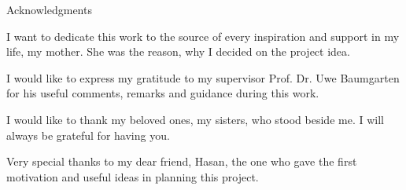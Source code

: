 \thispagestyle{empty}

\vspace*{20mm}

\begin{center}
{ Acknowledgments}
\end{center}

\vspace{10mm}

I want to dedicate this work to the source of every inspiration and support in my life, my mother. She was the reason, why I decided on the project idea.

I would like to express my gratitude to my supervisor Prof. Dr. Uwe Baumgarten for his useful comments, remarks and guidance during this work. 

I would like to thank my beloved ones, my sisters, who stood beside me. I will always be grateful for having you.

Very special thanks to my dear friend, Hasan, the one who gave the first motivation and useful ideas in planning this project.


\cleardoublepage{}
